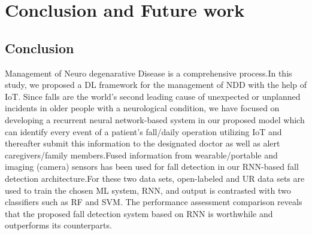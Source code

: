 \chapter{Conclusion and Future work}

\section{Conclusion}
Management of Neuro degenarative Disease is a comprehensive process.In this study,  we proposed a DL framework for the management of NDD with the help of IoT. Since falls are the world's second leading cause of unexpected or unplanned incidents in older people with a neurological condition, we have focused on developing a recurrent neural network-based system in our proposed model which can identify every event of a patient's fall/daily operation utilizing IoT and thereafter submit this information to the designated doctor as well as alert caregivers/family members.Fused information from wearable/portable and imaging (camera) sensors has been used for fall detection in our RNN-based fall detection architecture.For these two data sets, open-labeled and UR data sets are used to train the chosen ML system, RNN, and output is contrasted with two classifiers such as RF and SVM. The performance assessment comparison reveals that the proposed fall detection system based on RNN is worthwhile and outperforms its counterparts.


\\
